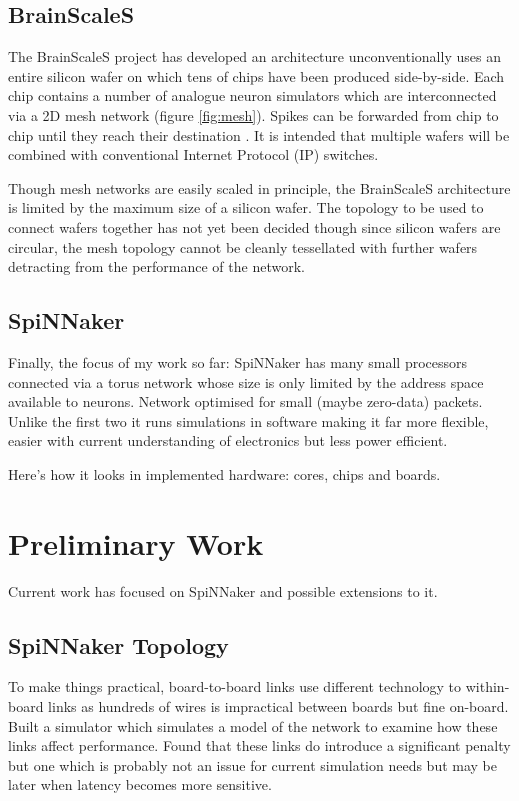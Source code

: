 	\subsection{BrainScaleS}
	
		The BrainScaleS project has developed an architecture unconventionally uses
		an entire silicon wafer on which tens of chips have been produced
		side-by-side. Each chip contains a number of analogue neuron simulators
		which are interconnected via a 2D mesh network (figure \ref{fig:mesh}).
		Spikes can be forwarded from chip to chip until they reach their destination
		\cite{schemmel08}. It is intended that multiple wafers will be combined with
		conventional Internet Protocol (IP) switches.
		
		Though mesh networks are easily scaled in principle, the BrainScaleS
		architecture is limited by the maximum size of a silicon wafer. The topology
		to be used to connect wafers together has not yet been decided though since
		silicon wafers are circular, the mesh topology cannot be cleanly tessellated
		with further wafers detracting from the performance of the network.
	
	\subsection{SpiNNaker}
	
		Finally, the focus of my work so far: SpiNNaker has many small processors
		connected via a torus network whose size is only limited by the address
		space available to neurons. Network optimised for small (maybe zero-data)
		packets.  Unlike the first two it runs simulations in software making it far
		more flexible, easier with current understanding of electronics but less
		power efficient.
		
		Here's how it looks in implemented hardware: cores, chips and boards.

\section{Preliminary Work}

Current work has focused on SpiNNaker and possible extensions to it.

\subsection{SpiNNaker Topology}

To make things practical, board-to-board links use different technology to
within-board links as hundreds of wires is impractical between boards but fine
on-board. Built a simulator which simulates a model of the network to examine
how these links affect performance. Found that these links do introduce a
significant penalty but one which is probably not an issue for current
simulation needs but may be later when latency becomes more sensitive.

